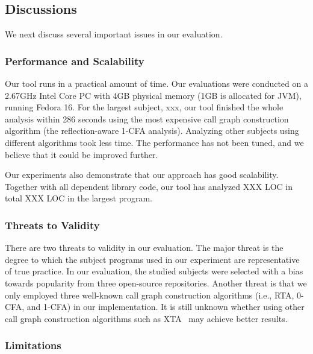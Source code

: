 \subsection{Discussions}

We next discuss several important issues in our evaluation.

\subsubsection{Performance and Scalability}

Our tool runs in a practical amount of time. Our evaluations
were conducted on a 2.67GHz Intel Core PC with 4GB
physical memory (1GB is allocated for JVM), running Fedora 16.
For the largest subject, xxx, our tool finished the whole analysis
within 286 seconds using the most expensive call graph construction
algorithm (the reflection-aware 1-CFA analysis). Analyzing
other subjects using different algorithms took less time.
The performance has not been tuned, and we believe
that it could be improved further.

Our experiments also demonstrate that our approach has good scalability.
Together with all dependent library code, our tool has analyzed
XXX LOC in total  XXX LOC in the largest program.



\subsubsection{Threats to Validity}

There are two threats to validity in our evaluation. 
The major threat is the degree to which the subject programs
used in our experiment are representative of true practice.
In our evaluation, the studied subjects were selected with a bias towards popularity from
three open-source repositories. Another threat is that we only employed three
well-known call graph construction algorithms (i.e., RTA, 0-CFA, and 1-CFA) 
in our implementation. It is still unknown whether using other 
call graph construction algorithms such as XTA~\cite{xta} may achieve better results.

\subsubsection{Limitations}

